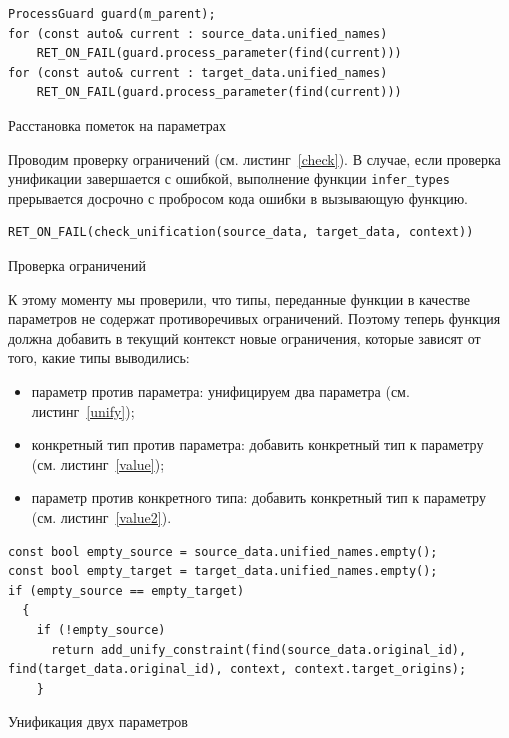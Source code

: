 \begin{ListingEnv}[h]
	\begin{lstlisting}
ProcessGuard guard(m_parent);
for (const auto& current : source_data.unified_names)
	RET_ON_FAIL(guard.process_parameter(find(current)))
for (const auto& current : target_data.unified_names)
	RET_ON_FAIL(guard.process_parameter(find(current)))
	\end{lstlisting}
	\caption{Расстановка пометок на параметрах}\label{mark_guard}
\end{ListingEnv}
		Проводим проверку ограничений (см. листинг~\ref{check}). %
		В случае, если проверка унификации завершается с ошибкой, выполнение функции \lstinline!infer_types! прерывается досрочно с пробросом кода ошибки в вызывающую функцию.
\begin{ListingEnv}[H]
	\begin{lstlisting}	
RET_ON_FAIL(check_unification(source_data, target_data, context))
	\end{lstlisting}
	\caption{Проверка ограничений}\label{check}
\end{ListingEnv}

К этому моменту мы проверили, что типы, переданные функции в качестве параметров не содержат противоречивых ограничений. Поэтому теперь функция должна добавить в текущий контекст новые ограничения, которые зависят от того, какие типы выводились:
\begin{itemize}
	\item параметр против параметра: унифицируем два параметра (см. листинг~\ref{unify});
	\item конкретный тип против параметра: добавить конкретный тип к параметру (см. листинг~\ref{value});
	\item параметр против конкретного типа: добавить конкретный тип к параметру (см. листинг~\ref{value2}).
\end{itemize}

\begin{ListingEnv}[h]
	\begin{lstlisting}
const bool empty_source = source_data.unified_names.empty();
const bool empty_target = target_data.unified_names.empty();
if (empty_source == empty_target)
  {
    if (!empty_source)
      return add_unify_constraint(find(source_data.original_id),   find(target_data.original_id), context, context.target_origins);
    }
	\end{lstlisting}
	\caption{Унификация двух параметров}\label{unify}
\end{ListingEnv}

